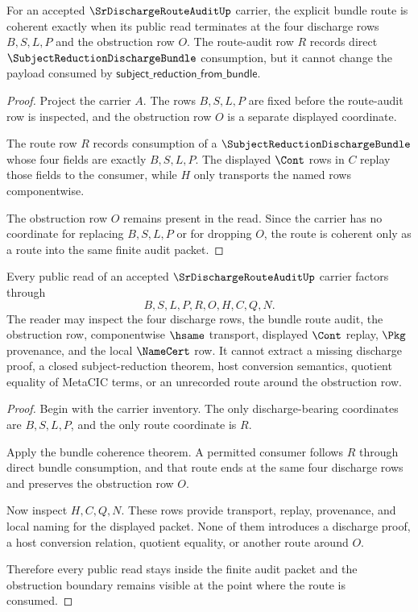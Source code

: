 \begin{theorem}
\label{thm:sr-discharge-route-audit-bundle-typeclass-coherence}
For an accepted $\SrDischargeRouteAuditUp$ carrier, the explicit bundle route is coherent exactly when its public read terminates at the four discharge rows $B,S,L,P$ and the obstruction row $O$. The route-audit row $R$ records direct $\SubjectReductionDischargeBundle$ consumption, but it cannot change the payload consumed by $\mathsf{subject\_reduction\_from\_bundle}$.
\end{theorem}
\begin{proof}
Project the carrier $A$. The rows $B,S,L,P$ are fixed before the route-audit row is inspected, and the obstruction row $O$ is a separate displayed coordinate.

The route row $R$ records consumption of a $\SubjectReductionDischargeBundle$ whose four fields are exactly $B,S,L,P$. The displayed $\Cont$ rows in $C$ replay those fields to the consumer, while $H$ only transports the named rows componentwise.

The obstruction row $O$ remains present in the read. Since the carrier has no coordinate for replacing $B,S,L,P$ or for dropping $O$, the route is coherent only as a route into the same finite audit packet.
\end{proof}

\begin{theorem}
\label{thm:sr-discharge-route-audit-nonescape}
Every public read of an accepted $\SrDischargeRouteAuditUp$ carrier factors through
$$
B,S,L,P,R,O,H,C,Q,N.
$$
The reader may inspect the four discharge rows, the bundle route audit, the obstruction row, componentwise $\hsame$ transport, displayed $\Cont$ replay, $\Pkg$ provenance, and the local $\NameCert$ row. It cannot extract a missing discharge proof, a closed subject-reduction theorem, host conversion semantics, quotient equality of MetaCIC terms, or an unrecorded route around the obstruction row.
\end{theorem}
\begin{proof}
Begin with the carrier inventory. The only discharge-bearing coordinates are $B,S,L,P$, and the only route coordinate is $R$.

Apply the bundle coherence theorem. A permitted consumer follows $R$ through direct bundle consumption, and that route ends at the same four discharge rows and preserves the obstruction row $O$.

Now inspect $H,C,Q,N$. These rows provide transport, replay, provenance, and local naming for the displayed packet. None of them introduces a discharge proof, a host conversion relation, quotient equality, or another route around $O$.

Therefore every public read stays inside the finite audit packet and the obstruction boundary remains visible at the point where the route is consumed.
\end{proof}

